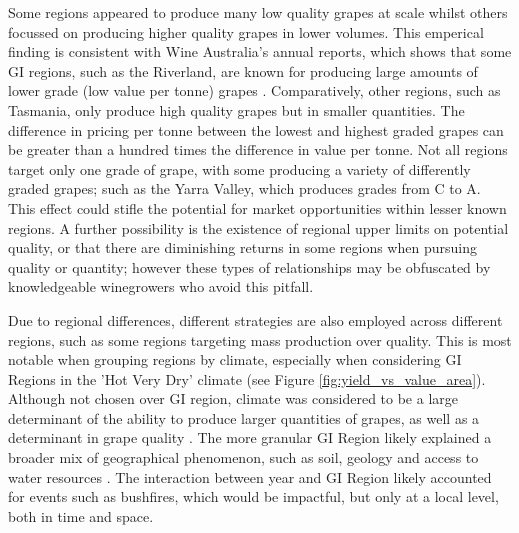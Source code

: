 \documentclass[review,12pt,authoryear]{elsarticle}
\begin{document}
\begin{linenumbers}
\par
Some regions appeared to produce many low quality grapes at scale whilst others focussed on producing higher quality grapes in lower volumes. This emperical finding is consistent with Wine Australia's annual reports, which shows that some GI regions, such as the Riverland, are known for producing large amounts of lower grade (low value per tonne) grapes \citep{wineaustraliaNationalVintageReport2022,winemakersfederationofaustraliaNationalVintageReport2017}. Comparatively, other regions, such as Tasmania, only produce high quality grapes but in smaller quantities. The difference in pricing per tonne between the lowest and highest graded grapes can be greater than a hundred times the difference in value per tonne. Not all regions target only one grade of grape, with some producing a variety of differently graded grapes; such as the Yarra Valley, which produces grades from C to A. This effect could stifle the potential for market opportunities within lesser known regions. A further possibility is the existence of regional upper limits on potential quality, or that there are diminishing returns in some regions when pursuing quality or quantity; however these types of relationships may be obfuscated by knowledgeable winegrowers who avoid this pitfall.
\par
Due to regional differences, different strategies are also  employed across different regions, such as some regions targeting mass production over quality. This is most notable when grouping regions by climate, especially when considering GI Regions in the 'Hot Very Dry' climate (see Figure \ref{fig:yield_vs_value_area}). 
Although not chosen over GI region, climate was considered to be a large determinant of the ability to produce larger quantities of grapes, as well as a determinant in grape quality \citep{agostaRegionalClimateVariability2012}. The more granular GI Region likely explained a broader mix of geographical phenomenon, such as soil, geology and access to water resources \citep{abbalDecisionSupportSystem2016,carmonaUseParticipatoryObjectOriented2011}. The interaction between year and GI Region likely accounted for events such as bushfires, which would be impactful, but only at a local level, both in time and space.
\par

\end{linenumbers}
\end{document}
